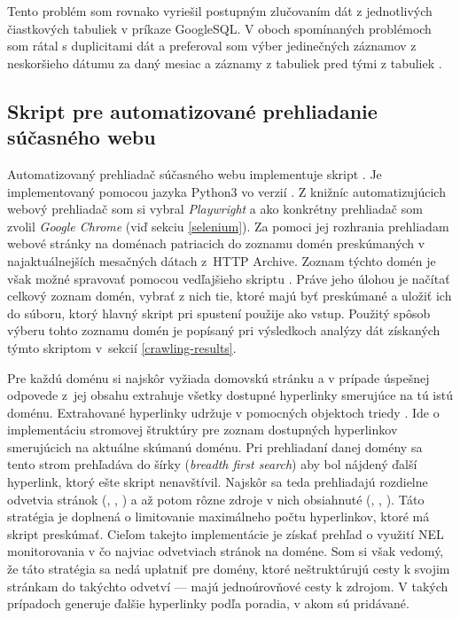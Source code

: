 Tento problém som rovnako vyriešil postupným zlučovaním dát z jednotlivých čiastkových tabuliek v príkaze GoogleSQL.
V oboch spomínaných problémoch som rátal s duplicitami dát a preferoval som výber jedinečných záznamov z neskoršieho dátumu za daný mesiac a záznamy z tabuliek  pred tými z tabuliek .


\subsection{Skript pre automatizované prehliadanie súčasného webu}
\label{crawl_and_store}

Automatizovaný prehliadač súčasného webu implementuje skript .
Je implementovaný pomocou jazyka Python3 vo verzií . 
Z knižníc automatizujúcich webový prehliadač som si vybral \textit{Playwright} a  ako konkrétny prehliadač som zvolil \textit{Google Chrome} (viď sekciu \ref{selenium}). 
Za pomoci jej rozhrania prehliadam webové stránky na doménach patriacich do zoznamu domén preskúmaných v najaktuálnejších mesačných dátach \mbox{z HTTP} Archive.
Zoznam týchto domén je však možné spravovať pomocou vedľajšieho skriptu .
Práve jeho úlohou je načítať celkový zoznam domén, vybrať z nich tie, ktoré majú byť preskúmané a uložiť ich do súboru, ktorý hlavný skript pri spustení použije ako vstup.
Použitý spôsob výberu tohto zoznamu domén je popísaný pri výsledkoch analýzy dát získaných týmto skriptom \mbox{v sekcií} \ref{crawling-results}. 

Pre každú doménu si najskôr vyžiada domovskú stránku a v prípade úspešnej odpovede \mbox{z jej} obsahu extrahuje všetky dostupné hyperlinky smerujúce na tú istú doménu.
Extrahované hyperlinky udržuje v pomocných objektoch triedy .
Ide o implementáciu stromovej štruktúry pre zoznam dostupných hyperlinkov smerujúcich na aktuálne skúmanú doménu. 
Pri prehliadaní danej domény sa tento strom prehľadáva do šírky (\textit{breadth first search}) aby bol nájdený ďalší hyperlink, ktorý ešte skript nenavštívil.
Najskôr sa teda prehliadajú rozdielne odvetvia stránok (, , ) a až potom rôzne zdroje v nich obsiahnuté (, , ).
Táto stratégia je doplnená o limitovanie maximálneho počtu hyperlinkov, ktoré má skript preskúmať.
Cieľom takejto implementácie je získať prehľad o využití NEL monitorovania v čo najviac odvetviach stránok na doméne.
Som si však vedomý, že táto stratégia sa nedá uplatniť pre domény, ktoré neštruktúrujú cesty k svojim stránkam do takýchto odvetví --- majú jednoúrovňové cesty k zdrojom.
V takých prípadoch generuje  ďalšie hyperlinky podľa poradia, v akom sú pridávané.

